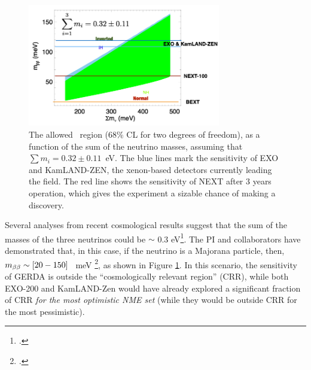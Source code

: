 \begin{figure}
\centering
\includegraphics[width=0.75\textwidth]{img/SensiCRR.png}
\caption{The allowed \mbb\ region (68\% CL for two degrees of freedom), as a function of the sum of the neutrino masses, assuming that 
$\sum m_i = 0.32\pm 0.11$~eV. The blue lines mark the sensitivity of EXO and KamLAND-ZEN, the xenon-based detectors currently leading the field. The red line shows the sensitivity of NEXT after 3 years operation, which gives the experiment a sizable chance of making a discovery.} 
\label{fig.mbb}
\end{figure}

 Several analyses from recent cosmological results suggest that the sum of the masses of the three neutrinos could be $\sim$ 0.3 eV\footcite{PhysRevLett.112.051303}. The PI and collaborators have demonstrated that, in this case, if the neutrino is a Majorana particle, then, $m_{\beta\beta} \sim [20-150]$~ meV \footcite{GomezCadenas:2013ue}, as shown in Figure \ref{fig.mbb}. In this scenario, the sensitivity of GERDA is outside the ``cosmologically relevant region'' (CRR), while both EXO-200 and KamLAND-Zen would have already explored a significant fraction of CRR {\em for the most optimistic NME set} (while they would be outside CRR for the most pessimistic). 
 
% 
 
